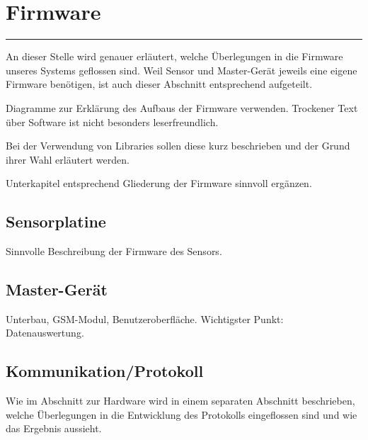 \chapter{Firmware}
\label{chap:firmware}

{%
    \small
    \startcontents[chapters]
}

\plainbreak{1}

An  dieser  Stelle wird  genauer  erl\"autert,  welche \"Uberlegungen  in  die
Firmware  unseres  Systems  geflossen  sind. Weil  Sensor  und  Master-Ger\"at
jeweils  eine   eigene  Firmware   ben\"otigen,  ist  auch   dieser  Abschnitt
entsprechend aufgeteilt.

\anweisung   Diagramme    zur   Erkl\"arung    des   Aufbaus    der   Firmware
verwenden. Trockener    Text    \"uber    Software   ist    nicht    besonders
leserfreundlich.

\anweisung Bei der Verwendung von  Libraries sollen diese kurz beschrieben und
der Grund ihrer Wahl erl\"autert werden.

\anweisung   Unterkapitel  entsprechend   Gliederung  der   Firmware  sinnvoll
erg\"anzen.

\section{Sensorplatine}
\label{sec:fw:sensorplatine}

Sinnvolle Beschreibung der Firmware des Sensors.


\section{Master-Ger\"at}
\label{sec:fw:mastergerat}

Unterbau, GSM-Modul, Benutzeroberfl\"ache. Wichtigster Punkt: Datenauswertung.


\section{Kommunikation/Protokoll}
\label{sec:fw:sensorplatine}

Wie im Abschnitt  zur Hardware wird in einem  separaten Abschnitt beschrieben,
welche \"Uberlegungen in die Entwicklung  des Protokolls eingeflossen sind und
wie das Ergebnis aussieht.
